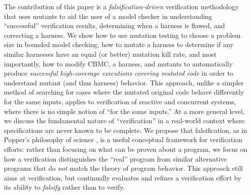 \documentclass[conference]{IEEEtran}
\begin{document}

The contribution of this paper is a \emph{falsification-driven}
verification methodology that uses mutants to aid the user of a model
checker in understanding ``successful'' verification
results, determining when a harness is flawed, and correcting a harness.
We show how to use mutation testing to
choose a problem size in bounded model checking, how to mutate a
harness to determine if any similar harnesses have an equal (or
better) mutation kill rate, and most importantly, how to modify CBMC,
a harness, and mutants to automatically produce \emph{successful
  high-coverage executions covering mutated code} in order to
understand mutant (and thus harness) behavior.  This
approach, unlike a simpler method of searching for cases where the
mutated original code behave differently for the same inputs,
applies to verification of reactive and concurrent systems, where
there is no simple notion of ``for the same inputs.''  
At a more general level, we discuss the fundamental nature of
``verification'' in a real-world context where specifications are
never known to be complete. We propose that falsification, as in
Popper's philosophy of science \cite{Popper}, is a useful conceptual
framework for verification efforts: rather than focusing on what can
be proven about a program, we focus on how a
verification distinguishes the ``real'' program from similar
alternative programs that do \emph{not} match the theory of program
behavior.  This approach still aims at verification, but continually
evaluates and refines a verification effort by its ability to
\emph{falsify} rather than to verify.
\end{document}
